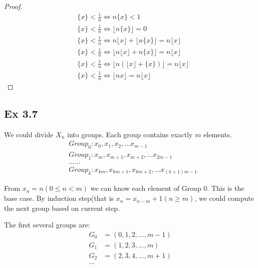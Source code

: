 \documentclass{article}
\begin{document}
\begin{proof}
    \begin{equation}
        \begin{split}
          & \{x\} < \frac{1}{n} \iff n\{x\} < 1 \\
          & \{x\} < \frac{1}{n} \iff \lfloor n\{x\} \rfloor = 0 \\
          & \{x\} < \frac{1}{n} \iff n\lfloor x \rfloor + \lfloor n\{x\} \rfloor  = n\lfloor x \rfloor\\
          & \{x\} < \frac{1}{n} \iff \lfloor n\lfloor x \rfloor  + n\{x\}\rfloor = n\lfloor x \rfloor\\
          & \{x\} < \frac{1}{n} \iff \lfloor n(\lfloor x \rfloor + \{x\}) \rfloor = n\lfloor x \rfloor\\
          & \{x\} < \frac{1}{n} \iff \lfloor nx \rfloor = n\lfloor x \rfloor
        \end{split}
    \end{equation}
\end{proof}

\subsection{Ex 3.7}

We could divide $X_n$ into groups. Each group contains exactly $m$ elements.
\begin{equation}
    \begin{split}
        & Group_0: x_0, x_1, x_2, \dots x_{m-1}\\
        & Group_1: x_m, x_{m+1}, x_{m+2}, \dots x_{2m-1}\\
        & \dots \dots\\
        & Group_k: x_{km}, x_{km+1}, x_{km+2}, \dots x_{(k+1)m-1}
    \end{split}
\end{equation}

From $x_n = n (0 \le n < m)$ we can know each element of Group $0$. This is the base case. By induction step(that is $x_n = x_{n-m} + 1(n\ge m)$, we could compute the next group based on current step.

The first several groups are:
\begin{equation}
    \begin{split}
        G_0 & = (0, 1, 2, \dots, m-1)\\
        G_1 & = (1, 2, 3, \dots, m)\\
        G_2 & = (2, 3, 4, \dots, m+1)\\
        \dots
    \end{split}
\end{equation}
\end{document}
